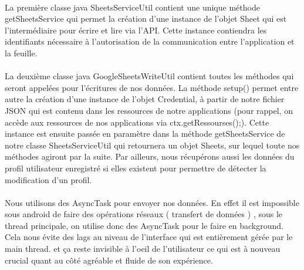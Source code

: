 \documentclass[a4paper, 11pt]{article}
\begin{document}
\paragraph{}
La première classe java SheetsServiceUtil contient une unique méthode getSheetsService qui permet la création d’une instance de l’objet Sheet qui est l'intermédiaire pour écrire et lire via l’API. Cette instance contiendra les identifiants nécessaire à l’autorisation de la communication entre l’application et la feuille.
\paragraph{}
La deuxième classe java GoogleSheetsWriteUtil contient toutes les méthodes qui seront appelées pour l’écritures de nos données. 
La méthode setup() permet entre autre la création d’une instance de l’objet Credential, à partir de notre fichier JSON qui est contenu dans les ressources de notre applications (pour rappel, on accède aux ressources de nos applications via ctx.getRessourses();). Cette instance est ensuite passée en paramètre dans la méthode getSheetsService de notre classe SheetsServiceUtil qui retournera un objet Sheets, sur lequel toute nos méthodes agiront par la suite.
Par ailleurs, nous récupérons aussi les données du profil utilisateur enregistré si elles existent pour permettre de détecter la modification d’un profil.
\paragraph{}
Nous utilisons des AsyncTask pour envoyer nos données. En effet il est impossible sous android de faire des opérations réseaux ( transfert de données ) , sous le thread principale, on utilise donc des AsyncTask pour le faire en background. Cela nous évite des lags au niveau de l’interface qui est entièrement gérée par le main thread.
et ça reste invisible à l’oeil de l’utilisateur ce qui est à nouveau crucial quant au côté agréable et fluide de son expérience.
\end{document}
